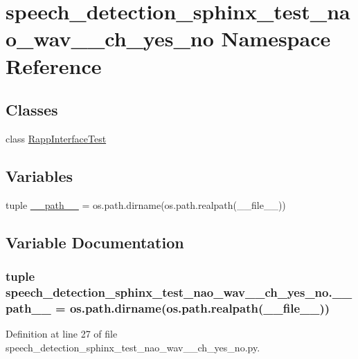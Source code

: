 \hypertarget{namespacespeech__detection__sphinx__test__nao__wav__1__ch__yes__no}{\section{speech\-\_\-detection\-\_\-sphinx\-\_\-test\-\_\-nao\-\_\-wav\-\_\-\_\-ch\-\_\-yes\-\_\-no Namespace Reference}
\label{namespacespeech__detection__sphinx__test__nao__wav__1__ch__yes__no}
}
\subsection*{Classes}
\begin{DoxyCompactItemize}
\item 
class \hyperlink{classspeech__detection__sphinx__test__nao__wav__1__ch__yes__no_1_1RappInterfaceTest}{Rapp\-Interface\-Test}
\end{DoxyCompactItemize}
\subsection*{Variables}
\begin{DoxyCompactItemize}
\item 
tuple \hyperlink{namespacespeech__detection__sphinx__test__nao__wav__1__ch__yes__no_a1fb580bee1967ebcb09b5fe4eed7bc8d}{\-\_\-\-\_\-path\-\_\-\-\_\-} = os.\-path.\-dirname(os.\-path.\-realpath(\-\_\-\-\_\-file\-\_\-\-\_\-))
\end{DoxyCompactItemize}


\subsection{Variable Documentation}
\hypertarget{namespacespeech__detection__sphinx__test__nao__wav__1__ch__yes__no_a1fb580bee1967ebcb09b5fe4eed7bc8d}{
\subsubsection[{\-\_\-\-\_\-path\-\_\-\-\_\-}]{\setlength{\rightskip}{0pt plus 5cm}tuple speech\-\_\-detection\-\_\-sphinx\-\_\-test\-\_\-nao\-\_\-wav\-\_\-\_\-ch\-\_\-yes\-\_\-no.\-\_\-\-\_\-path\-\_\-\-\_\- = os.\-path.\-dirname(os.\-path.\-realpath(\-\_\-\-\_\-file\-\_\-\-\_\-))}}\label{namespacespeech__detection__sphinx__test__nao__wav__1__ch__yes__no_a1fb580bee1967ebcb09b5fe4eed7bc8d}


Definition at line 27 of file speech\-\_\-detection\-\_\-sphinx\-\_\-test\-\_\-nao\-\_\-wav\-\_\-\_\-ch\-\_\-yes\-\_\-no.\-py.

